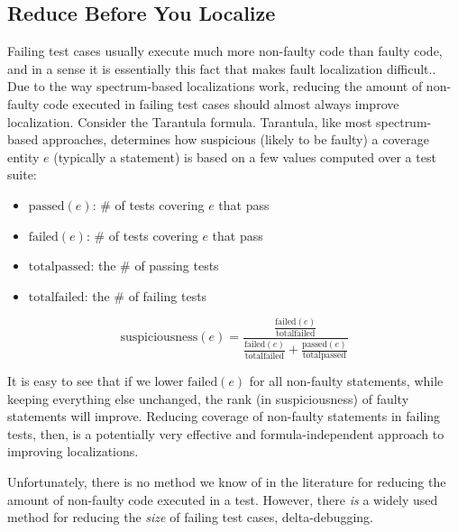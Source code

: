 \subsection{Reduce Before You Localize}

Failing test cases usually execute much more non-faulty code than
faulty code, and in a sense it is essentially this fact that makes fault localization difficult.. Due to the way spectrum-based localizations work,
reducing the amount of non-faulty code executed in failing test cases
should almost always improve localization.  Consider the Tarantula
\cite{Jones2002,Tarantula} formula.  Tarantula, like most spectrum-based
approaches, determines how suspicious (likely to be faulty) a coverage
entity $e$ (typically a statement) is based on a few values computed over
a test suite:

\begin{itemize}
\item $\text{passed}(e)$:  \# of tests covering $e$ that pass
\item $\text{failed}(e)$:  \# of tests covering $e$ that pass
\item $\text{totalpassed}$:  the \# of passing tests
\item $\text{totalfailed}$:  the \# of failing tests
\end{itemize}

$$ \text{suspiciousness}(e) =  \frac{\frac{\text{failed}(e)}{\text{totalfailed}}}{\frac{\text{failed}(e)}{\text{totalfailed}} + \frac{\text{passed}(e)}{\text{totalpassed}}}$$


It is easy to see that if we lower $\text{failed}(e)$ for all
non-faulty statements, while keeping everything else unchanged, the
rank (in suspiciousness) of faulty statements will improve.   Reducing coverage of non-faulty
statements in failing tests, then, is a potentially very effective  and
formula-independent approach to improving localizations.

Unfortunately, there is no method we know of in the literature for reducing the
amount of non-faulty code executed in a test.  However, there \emph{is} a widely
used method for reducing the \emph{size} of failing test cases, delta-debugging.

